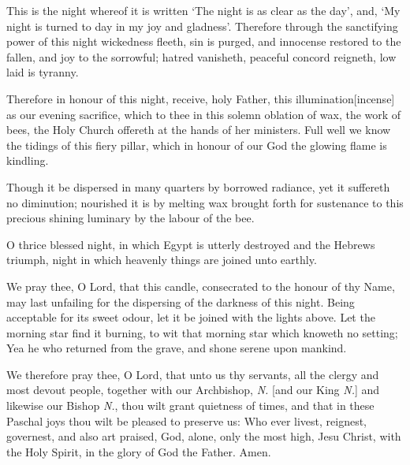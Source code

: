 This is the night whereof it is written ‘The night is as clear as the day’, and, ‘My night is turned to day in my joy and gladness’.  Therefore through the sanctifying power of this night wickedness fleeth, sin is purged, and innocense restored to the fallen, and joy to the sorrowful; hatred vanisheth, peaceful concord reigneth, low laid is tyranny.


{\centering{}\par}


Therefore in honour of this night, receive, holy Father, this illumination[incense]  as our evening sacrifice, which to thee in this solemn oblation of wax, the work of bees, the Holy Church offereth at the hands of her ministers. Full well we know the tidings of this fiery pillar, which in honour of our God the glowing flame is kindling.


{\centering{}\par}


Though it be dispersed in many quarters by borrowed radiance, yet it suffereth no diminution; nourished it is by melting wax brought forth for sustenance to this precious shining luminary by the labour of the bee.

O thrice blessed night, in which Egypt is utterly destroyed and the Hebrews triumph, night in which heavenly things are joined unto earthly.

We pray thee, O Lord, that this candle, consecrated to the honour of thy Name, may last unfailing for the dispersing of the darkness of this night.  Being acceptable for its sweet odour, let it be joined with the lights above. Let the morning star find it burning, to wit that morning star which knoweth no setting; Yea he who returned from the grave, and shone serene upon mankind.

We therefore pray thee, O Lord, that unto us thy servants, all the clergy and most devout people, together with our Archbishop, \emph{N.} [and our King \emph{N.}] and likewise our Bishop \emph{N.}, thou wilt grant quietness of times, and that in these Paschal joys thou wilt be pleased to preserve us:  Who ever livest, reignest, governest, and also art praised, God, alone, only the most high, Jesu Christ, with the Holy Spirit, in the glory of God the Father. \R Amen.



